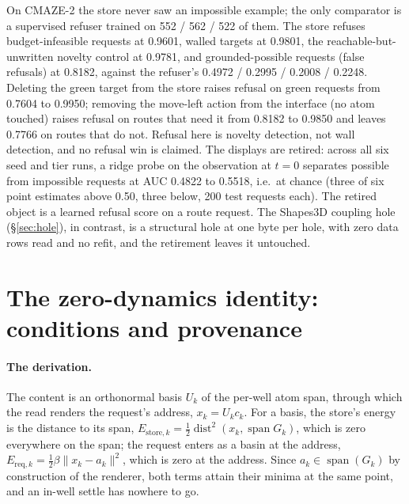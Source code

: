 \documentclass{article} %
\begin{document}
On CMAZE-2 the store never saw an impossible example; the only comparator is a supervised
refuser trained on 552 / 562 / 522 of them. The store refuses budget-infeasible requests at 0.9601,
walled targets at 0.9801, the reachable-but-unwritten novelty control at 0.9781, and
grounded-possible requests (false refusals) at 0.8182, against the refuser's 0.4972 / 0.2995 /
0.2008 / 0.2248. Deleting the green target from the store raises refusal on green requests from
0.7604 to 0.9950; removing the move-left action from the interface (no atom touched) raises
refusal on routes that need it from 0.8182 to 0.9850 and leaves 0.7766 on routes that do not.
Refusal here is novelty detection, not wall detection, and no refusal win is claimed. The displays
are retired: across all six seed and tier runs, a ridge probe on the observation at $t=0$ separates
possible from impossible requests at AUC 0.4822 to 0.5518, i.e.\ at chance (three of six point estimates above 0.50, three below, 200 test requests each). The retired object is a learned
refusal score on a route request. The Shapes3D coupling hole (\S\ref{sec:hole}), in contrast, is a
structural hole at one byte per hole, with zero data rows read and no refit, and the retirement
leaves it untouched. %

\section{The zero-dynamics identity: conditions and provenance}
\label{app:clue}

\paragraph{The derivation.} The content is an orthonormal basis $U_k$ of the per-well atom span,
through which the read renders the request's address, $x_k=U_k c_k$. For a basis, the store's
energy is the distance to its span,
$E_{\text{store},k}=\tfrac12\operatorname{dist}^2(x_k,\operatorname{span}G_k)$, which is zero
everywhere on the span; the request enters as a basin at the address, $E_{\text{req},k}=\tfrac12\beta\lVert
x_k-a_k\rVert^2$, which is zero at the address. Since $a_k\in\operatorname{span}(G_k)$ by
construction of the renderer, both terms attain their minima at the same point, and an in-well
settle has nowhere to go.
\end{document}
